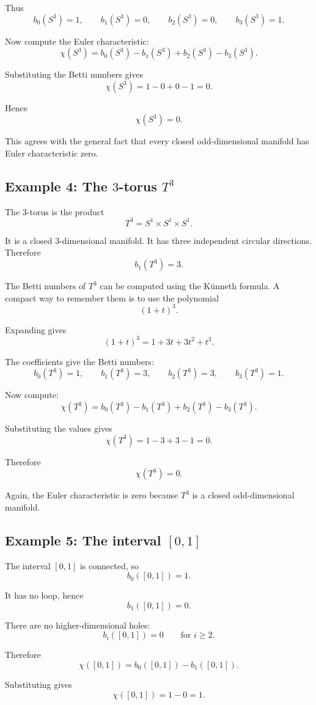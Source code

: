 \documentclass[12pt,a4paper]{article}
\theoremstyle{notespace}
\begin{document}
Thus
\[
b_0(S^3)=1,
\qquad
b_1(S^3)=0,
\qquad
b_2(S^3)=0,
\qquad
b_3(S^3)=1.
\]

Now compute the Euler characteristic:
\[
\chi(S^3)
=
b_0(S^3)-b_1(S^3)+b_2(S^3)-b_3(S^3).
\]

Substituting the Betti numbers gives
\[
\chi(S^3)=1-0+0-1=0.
\]

Hence
\[
\boxed{\chi(S^3)=0.}
\]

This agrees with the general fact that every closed odd-dimensional manifold
has Euler characteristic zero.

\subsection{Example 4: The $3$-torus $T^3$}

The $3$-torus is the product
\[
T^3=S^1\times S^1\times S^1.
\]

It is a closed $3$-dimensional manifold. It has three independent circular
directions. Therefore
\[
b_1(T^3)=3.
\]

The Betti numbers of $T^3$ can be computed using the Künneth formula. A compact
way to remember them is to use the polynomial
\[
(1+t)^3.
\]

Expanding gives
\[
(1+t)^3=1+3t+3t^2+t^3.
\]

The coefficients give the Betti numbers:
\[
b_0(T^3)=1,
\qquad
b_1(T^3)=3,
\qquad
b_2(T^3)=3,
\qquad
b_3(T^3)=1.
\]

Now compute:
\[
\chi(T^3)
=
b_0(T^3)-b_1(T^3)+b_2(T^3)-b_3(T^3).
\]

Substituting the values gives
\[
\chi(T^3)=1-3+3-1=0.
\]

Therefore
\[
\boxed{\chi(T^3)=0.}
\]

Again, the Euler characteristic is zero because $T^3$ is a closed
odd-dimensional manifold.

\subsection{Example 5: The interval $[0,1]$}

The interval $[0,1]$ is connected, so
\[
b_0([0,1])=1.
\]

It has no loop, hence
\[
b_1([0,1])=0.
\]

There are no higher-dimensional holes:
\[
b_i([0,1])=0
\qquad
\text{for } i\geq 2.
\]

Therefore
\[
\chi([0,1])
=
b_0([0,1])-b_1([0,1]).
\]

Substituting gives
\[
\chi([0,1])=1-0=1.
\]
\end{document}

